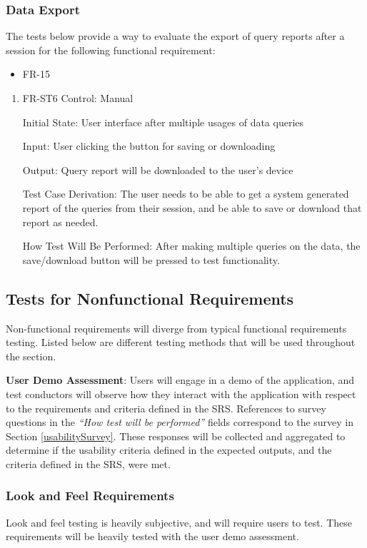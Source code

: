 \documentclass[12pt, titlepage]{article}
\begin{document}
  \subsubsection{Data Export}
  The tests below provide a way to evaluate the export of query reports after a
  session for the following functional requirement:
  \begin{itemize}
    \item FR-15
  \end{itemize}
  \begin{enumerate}
    \item{FR-ST6}
    Control: Manual

    Initial State: User interface after multiple usages of data queries

    Input: User clicking the button for saving or downloading

    Output: Query report will be downloaded to the user's device

    Test Case Derivation: The user needs to be able to get a system generated
    report of the queries from their session, and be able to save or download
    that report as needed.

    How Test Will Be Performed: After making multiple queries on the data, the
    save/download button will be pressed to test functionality.
  \end{enumerate}


\subsection{Tests for Nonfunctional Requirements}
Non-functional requirements will diverge from typical functional requirements
testing. Listed below are different testing methods that will be used throughout
the section.

\noindent \textbf{User Demo Assessment}: Users will engage in a demo of the
application, and test conductors will observe how they interact with the
application with respect to the requirements and criteria defined in the SRS.
References to survey questions in the \emph{``How test will be performed''}
fields correspond to the survey in Section \ref{usabilitySurvey}. These
responses will be collected and aggregated to determine if the usability
criteria defined in the expected outputs, and the criteria defined in the SRS,
were met.


\subsubsection{Look and Feel Requirements}
Look and feel testing is heavily subjective, and will require users to test.
These requirements will be heavily tested with the user demo assessment.
\end{document}
